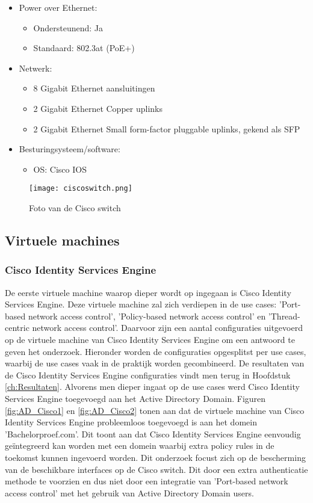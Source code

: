 \begin{itemize}
	\item Power over Ethernet:
	\begin{itemize}
		\item Ondersteunend: Ja
		\item Standaard: 802.3at (PoE+)
	\end{itemize}
	\item Netwerk:
	\begin{itemize}
		\item 8 Gigabit Ethernet aansluitingen
		\item 2 Gigabit Ethernet Copper uplinks
		\item 2 Gigabit Ethernet Small form-factor pluggable uplinks, gekend als SFP
	\end{itemize}
	\item Besturingsysteem/software:
	\begin{itemize}
		\item OS: Cisco IOS
    \end{itemize}
\end{itemize}

\begin{figure}[H]
	\centering
	\texttt{[image: ciscoswitch.png]}
	\caption{Foto van de Cisco switch}
	\label{fig:switch}
\end{figure}

\subsection{Virtuele machines}
\subsubsection{Cisco Identity Services Engine}
De eerste virtuele machine waarop dieper wordt op ingegaan is Cisco Identity Services Engine. Deze virtuele machine zal zich verdiepen in de use cases: 'Port-based network access control', 'Policy-based network access control' en 'Thread-centric network access control'. Daarvoor zijn een aantal configuraties uitgevoerd op de virtuele machine van Cisco Identity Services Engine om een antwoord te geven het onderzoek. Hieronder worden de configuraties opgesplitst per use cases, waarbij de use cases vaak in de praktijk worden gecombineerd. De resultaten van de Cisco Identity Services Engine configuraties vindt men terug in Hoofdstuk \ref{ch:Resultaten}.
\newline
\newline
Alvorens men dieper ingaat op de use cases werd Cisco Identity Services Engine toegevoegd aan het Active Directory Domain. Figuren \ref{fig:AD_Cisco1} en \ref{fig:AD_Cisco2} tonen aan dat de virtuele machine van Cisco Identity Services Engine probleemloos toegevoegd is aan het domein 'Bachelorproef.com'. Dit toont aan dat Cisco Identity Services Engine eenvoudig geïntegreerd kan worden met een domein waarbij extra policy rules  in de toekomst kunnen ingevoerd worden. Dit onderzoek focust zich op de bescherming van de beschikbare interfaces op de Cisco switch. Dit door een extra authenticatie methode te voorzien en dus niet door een integratie van 'Port-based network access control' met het gebruik van Active Directory Domain users.

